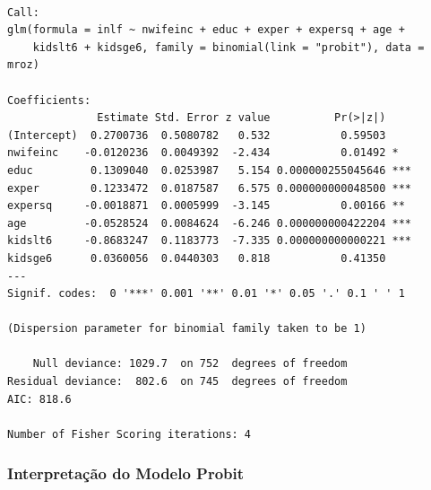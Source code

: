 \documentclass[
  letterpaper,
  DIV=11,
  numbers=noendperiod]{scrartcl}
\begin{document}
\begin{verbatim}

Call:
glm(formula = inlf ~ nwifeinc + educ + exper + expersq + age + 
    kidslt6 + kidsge6, family = binomial(link = "probit"), data = mroz)

Coefficients:
              Estimate Std. Error z value          Pr(>|z|)    
(Intercept)  0.2700736  0.5080782   0.532           0.59503    
nwifeinc    -0.0120236  0.0049392  -2.434           0.01492 *  
educ         0.1309040  0.0253987   5.154 0.000000255045646 ***
exper        0.1233472  0.0187587   6.575 0.000000000048500 ***
expersq     -0.0018871  0.0005999  -3.145           0.00166 ** 
age         -0.0528524  0.0084624  -6.246 0.000000000422204 ***
kidslt6     -0.8683247  0.1183773  -7.335 0.000000000000221 ***
kidsge6      0.0360056  0.0440303   0.818           0.41350    
---
Signif. codes:  0 '***' 0.001 '**' 0.01 '*' 0.05 '.' 0.1 ' ' 1

(Dispersion parameter for binomial family taken to be 1)

    Null deviance: 1029.7  on 752  degrees of freedom
Residual deviance:  802.6  on 745  degrees of freedom
AIC: 818.6

Number of Fisher Scoring iterations: 4
\end{verbatim}

\subsubsection{Interpretação do Modelo
Probit}\label{interpretauxe7uxe3o-do-modelo-probit}
\end{document}
